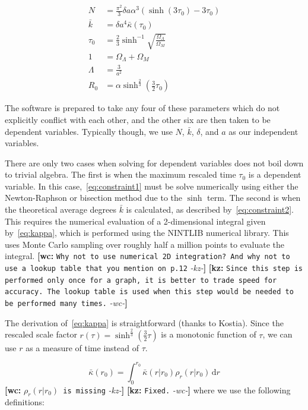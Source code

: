 \documentclass[preprint,notitlepage,amsmath,amssymb,floatfix]{revtex4-1}
\newcommand{\XXX}[3]{{\bf [#1: } {\tt #3} {\it -#2-}{\bf ]}}
\begin{document}
\begin{align}
N &= \frac{\pi^2}{3}\delta a\alpha^3\left(\sinh\left(3\tau_0\right)-3\tau_0\right) \label{eq:constraint1} \\
\bar{k} &= \delta a^4\bar{\kappa}\left(\tau_0\right) \label{eq:constraint2} \\
\tau_0 &= \frac{2}{3}\sinh^{-1}\sqrt{\frac{\Omega_\Lambda}{\Omega_M}} \label{eq:constraint3} \\
1 &= \Omega_\Lambda + \Omega_M \label{eq:constraint4} \\
\Lambda &= \frac{3}{a^2} \label{eq:constraint5} \\
R_0 &= \alpha\sinh^{\frac{2}{3}}\left(\frac{3}{2}\tau_0\right) \label{eq:constraint6}
\end{align}

\noindent The software is prepared to take any four of these parameters which do not explicitly conflict with each other, and the other six are then taken to be dependent variables.  
Typically though, we use $N$, $\bar{k}$, $\delta$, and $a$ as our independent variables. \par
There are only two cases when solving for dependent variables does not boil down to trivial algebra.  
The first is when the maximum rescaled time $\tau_0$ is a dependent variable.  
In this case,~\eqref{eq:constraint1} must be solve numerically using either the Newton-Raphson or bisection method due to the $\sinh$ term.  
The second is when the theoretical average degrees $\bar{k}$ is calculated, as described by~\eqref{eq:constraint2}.  
This requires the numerical evaluation of a 2-dimensional integral given by~\eqref{eq:kappa}, which is performed using the NINTLIB numerical library.  
This uses Monte Carlo sampling over roughly half a million points to evaluate the integral. \XXX{wc}{kz}{Why not to use numerical 2D integration? And why not to use a lookup table that you mention on p.12} \XXX{kz}{wc}{Since this step is performed only once for a graph, it is better to trade speed for accuracy.  The lookup table is used when this step would be needed to be performed many times.} \par
The derivation of~\eqref{eq:kappa} is straightforward (thanks to Kostia).
Since the rescaled scale factor $r\left(\tau\right) = \sinh^{\frac{2}{3}}\left(\frac{3}{2}\tau\right)$ is a monotonic function of $\tau$, we can use $r$ as a measure of time instead of $\tau$.

\begin{equation}
\bar\kappa\left(r_0\right) = \int_0^{r_0}\!\bar\kappa\left(r|r_0\right)\rho_r\left(r|r_0\right)\,\mathrm dr 
\end{equation}
\XXX{wc}{kz}{$\rho_r(r|r_0)$ is missing} \XXX{kz}{wc}{Fixed.}
\noindent where we use the following definitions:
\end{document}
